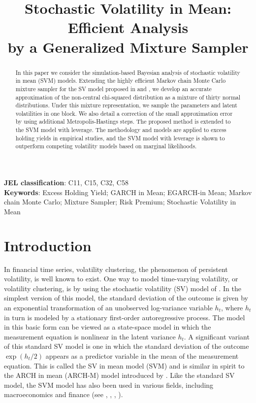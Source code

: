 
\title{Stochastic Volatility in Mean: Efficient Analysis \\ by a Generalized Mixture Sampler}
\maketitle

\begin{abstract}
In this paper we consider the simulation-based Bayesian analysis of stochastic volatility in mean (SVM) models. 
Extending the highly efficient Markov chain Monte Carlo mixture sampler for the SV model proposed in \cite{KimShephardChib(98)} and \cite{OmoriChibShephardNakajima(07)}, we develop an accurate approximation of the non-central chi-squared distribution as a mixture of thirty normal distributions. Under this mixture representation, we sample the parameters and latent volatilities in one block. We also detail a correction of the small approximation error by using additional Metropolis-Hastings steps. The proposed method is extended to the SVM model with leverage. The methodology and models are applied to excess holding yields in empirical studies, and the SVM model with leverage is shown to outperform competing volatility models based on marginal likelihoods.
\end{abstract}
{\bf JEL classification}: C11, C15, C32, C58
\\
{\bf Keywords}: Excess Holding Yield; GARCH in Mean; EGARCH-in Mean; Markov chain Monte Carlo; Mixture Sampler; Risk Premium; Stochastic Volatility in Mean

\newpage
\section{Introduction}
In financial time series, volatility clustering, the phenomenon of persistent volatility, is well known to exist. One way to model time-varying volatility, or volatility clustering, is by using the stochastic volatility (SV) model of \cite{Taylor(08)}. In the simplest version of this model, the standard deviation of the outcome is given by an exponential transformation of an unobserved log-variance variable $h_t$, where $h_t$ in turn is modeled by a stationary first-order autoregressive process. The model in this basic form can be viewed as a state-space model in which the measurement equation is nonlinear in the latent variance $h_t$. A significant variant of this standard SV model is one in which the standard deviation of the outcome $\exp(h_t/2)$ appears as a predictor variable in the mean of the measurement equation. This is called the SV in mean model (SVM) and is similar in spirit
to the ARCH in mean (ARCH-M) model introduced by \cite{EngelLilienRobins(87)}. 
Like the standard SV model, the SVM model has also been used in various fields, including
macroeconomics and finance (see \cite{KooopmanHol(02)}, \cite{BerumentYalcinYildirim(09)}, \cite{MumtazZanetti(13)}, \cite{CrossHouKoopPoon(23)}).

